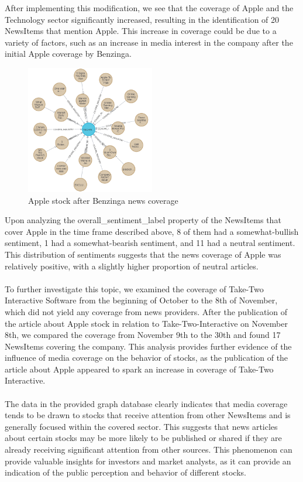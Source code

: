 After implementing this modification, we see that the coverage of Apple and the Technology sector significantly increased, resulting in the identification of 20 NewsItems that mention Apple. This increase in coverage could be due to a variety of factors, such as an increase in media interest in the company after the initial Apple coverage by Benzinga.

\begin{figure}[h]
 \centering
 \includegraphics[width=0.5\textwidth]{images/apple-after-benzinga.png}
 \caption{Apple stock after Benzinga news coverage }
 \label{fig:newsitems-apple-after-benzinga-coverage}
\end{figure}

Upon analyzing the overall\_sentiment\_label property of the NewsItems that cover Apple in the time frame described above, 8 of them had a somewhat-bullish sentiment, 1 had a somewhat-bearish sentiment, and 11 had a neutral sentiment. This distribution of sentiments suggests that the news coverage of Apple was relatively positive, with a slightly higher proportion of neutral articles. \\
\\
To further investigate this topic, we examined the coverage of Take-Two Interactive Software from the beginning of October to the 8th of November, which did not yield any coverage from news providers. After the publication of the article about Apple stock in relation to Take-Two-Interactive on November 8th, we compared the coverage from November 9th to the 30th and found 17 NewsItems covering the company. This analysis provides further evidence of the influence of media coverage on the behavior of stocks, as the publication of the article about Apple appeared to spark an increase in coverage of Take-Two Interactive.\\
\\
The data in the provided graph database clearly indicates that media coverage tends to be drawn to stocks that receive attention from other NewsItems and is generally focused within the covered sector. This suggests that news articles about certain stocks may be more likely to be published or shared if they are already receiving significant attention from other sources. This phenomenon can provide valuable insights for investors and market analysts, as it can provide an indication of the public perception and behavior of different stocks.



